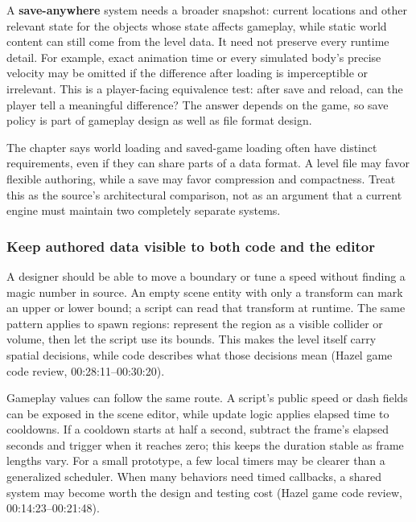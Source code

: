 A \textbf{save-anywhere} system needs a broader snapshot: current locations and other relevant state for the objects whose state affects gameplay, while static world content can still come from the level data. It need not preserve every runtime detail. For example, exact animation time or every simulated body's precise velocity may be omitted if the difference after loading is imperceptible or irrelevant. This is a player-facing equivalence test: after save and reload, can the player tell a meaningful difference? The answer depends on the game, so save policy is part of gameplay design as well as file format design.

The chapter says world loading and saved-game loading often have distinct requirements, even if they can share parts of a data format. A level file may favor flexible authoring, while a save may favor compression and compactness. Treat this as the source's architectural comparison, not as an argument that a current engine must maintain two completely separate systems.

\subsubsection{Keep authored data visible to both code and the editor}\label{06-engine-ii-ch031-keep-authored-data-visible-to-both-code-and-the-editor}

\hypertarget{06-engine-ii-ch031-keep-authored-data-visible-to-both-code-and-the-editor}{}

A designer should be able to move a boundary or tune a speed without finding a magic number in source. An empty scene entity with only a transform can mark an upper or lower bound; a script can read that transform at runtime. The same pattern applies to spawn regions: represent the region as a visible collider or volume, then let the script use its bounds. This makes the level itself carry spatial decisions, while code describes what those decisions mean (Hazel game code review, 00:28:11--00:30:20).

Gameplay values can follow the same route. A script's public speed or dash fields can be exposed in the scene editor, while update logic applies elapsed time to cooldowns. If a cooldown starts at half a second, subtract the frame's elapsed seconds and trigger when it reaches zero; this keeps the duration stable as frame lengths vary. For a small prototype, a few local timers may be clearer than a generalized scheduler. When many behaviors need timed callbacks, a shared system may become worth the design and testing cost (Hazel game code review, 00:14:23--00:21:48).

